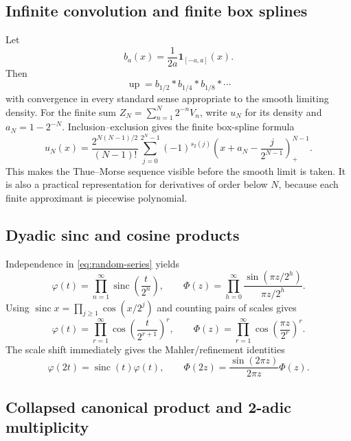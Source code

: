 \documentclass[11pt,oneside]{article}
\theoremstyle{definition}
\newcommand{\Up}{\operatorname{up}}
\newcommand{\sinc}{\operatorname{sinc}}
\newcommand{\wt}{s_2}
\newcommand{\PhiF}{\Phi}
\newcommand{\phiF}{\varphi}
\begin{document}
\subsection{Infinite convolution and finite box splines}

Let
\[
 b_a(x)=\frac1{2a}\mathbf 1_{[-a,a]}(x).
\]
Then
\begin{equation}
 \Up=b_{1/2}*b_{1/4}*b_{1/8}*\cdots
 \label{eq:infinite-convolution}
\end{equation}
with convergence in every standard sense appropriate to the smooth limiting density.
For the finite sum \(Z_N=\sum_{n=1}^N2^{-n}V_n\), write \(u_N\) for its density and
\(a_N=1-2^{-N}\).  Inclusion--exclusion gives the finite box-spline formula
\begin{equation}
 u_N(x)=\frac{2^{N(N-1)/2}}{(N-1)!}
 \sum_{j=0}^{2^N-1}(-1)^{\wt(j)}
 \left(x+a_N-\frac{j}{2^{N-1}}\right)_+^{N-1}.
 \label{eq:finite-box-spline}
\end{equation}
This makes the Thue--Morse sequence visible before the smooth limit is taken.  It is
also a practical representation for derivatives of order below \(N\), because each
finite approximant is piecewise polynomial.

\subsection{Dyadic sinc and cosine products}

Independence in \eqref{eq:random-series} yields
\begin{equation}
 \boxed{\quad
 \phiF(t)=\prod_{n=1}^{\infty}\sinc\!\left(\frac{t}{2^n}\right),
 \qquad
 \PhiF(z)=\prod_{h=0}^{\infty}
 \frac{\sin(\pi z/2^h)}{\pi z/2^h}.
 \quad}
 \label{eq:sinc-products}
\end{equation}
Using \(\sinc x=\prod_{j\ge1}\cos(x/2^j)\) and counting pairs of scales gives
\begin{equation}
 \phiF(t)=\prod_{r=1}^{\infty}
 \cos\!\left(\frac{t}{2^{r+1}}\right)^r,
 \qquad
 \PhiF(z)=\prod_{r=1}^{\infty}
 \cos\!\left(\frac{\pi z}{2^r}\right)^r.
 \label{eq:cosine-products}
\end{equation}
The scale shift immediately gives the Mahler/refinement identities
\begin{equation}
 \phiF(2t)=\sinc(t)\phiF(t),
 \qquad
 \PhiF(2z)=\frac{\sin(2\pi z)}{2\pi z}\PhiF(z).
 \label{eq:phi-scaling}
\end{equation}

\subsection{Collapsed canonical product and 2-adic multiplicity}
\end{document}
